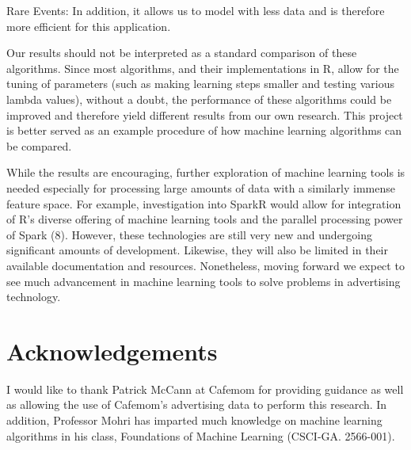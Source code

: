 \documentclass[a4paper]{article}
\begin{document}
\begin{multicols}{2}
Rare Events: In addition, it allows us to model with less data and is therefore more efficient for this application.


Our results should not be interpreted as a standard comparison of these algorithms. Since most algorithms, and their implementations in R, allow for the tuning of parameters (such as making learning steps smaller and testing various lambda values), without a doubt, the performance of these algorithms could be improved and therefore yield different results from our own research. This project is better served as an example procedure of how machine learning algorithms can be compared.

While the results are encouraging, further exploration of machine learning tools is needed especially for processing large amounts of data with a similarly immense feature space. For example, investigation into SparkR would allow for integration of R's diverse offering of machine learning tools and the parallel processing power of Spark (8). However, these technologies are still very new and undergoing significant amounts of development. Likewise, they will also be limited in their available documentation and resources. Nonetheless, moving forward we expect to see much advancement in machine learning tools to solve problems in advertising technology.

\section*{Acknowledgements}
I would like to thank Patrick McCann at Cafemom for providing guidance as well as allowing the use of Cafemom's advertising data to perform this research. In addition, Professor Mohri has imparted much knowledge on machine learning algorithms in his class, Foundations of Machine Learning (CSCI-GA. 2566-001).

\end{multicols}
\end{document}
